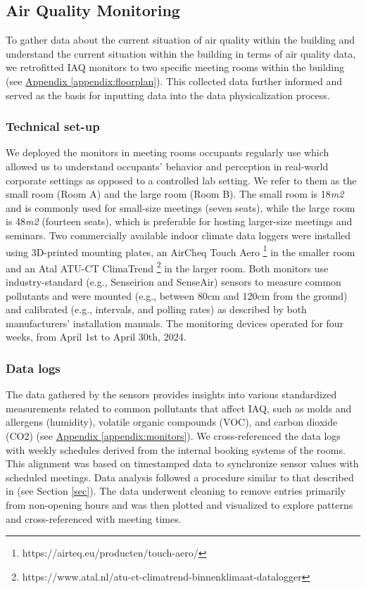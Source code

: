 \newpage

\subsection{Air Quality Monitoring}
\label{sec:monitoring}

To gather data about the current situation of air quality within the building and understand the current situation within the building in terms of air quality data, we retrofitted IAQ monitors to two specific meeting rooms within the building (see \hyperref[appendix:floorplan]{Appendix \ref*{appendix:floorplan}}). This collected data further informed and served as the basis for inputting data into the data physicalization process.

\subsubsection{Technical set-up}

We deployed the monitors in meeting rooms occupants regularly use which allowed us to understand occupants' behavior and perception in real-world corporate settings as opposed to a controlled lab setting. We refer to them as the small room (Room A) and the large room (Room B). The small room is 18\textit{m2} and is commonly used for small-size meetings (seven seats), while the large room is 48\textit{m2} (fourteen seats), which is preferable for hosting larger-size meetings and seminars. Two commercially available indoor climate data loggers were installed using 3D-printed mounting plates, an AirCheq Touch Aero \footnote{https://airteq.eu/producten/touch-aero/} in the smaller room and an Atal ATU-CT ClimaTrend \footnote{https://www.atal.nl/atu-ct-climatrend-binnenklimaat-datalogger} in the larger room. Both monitors use industry-standard (e.g., Senseirion and SenseAir) sensors to measure common pollutants and were mounted (e.g., between 80cm and 120cm from the ground) and calibrated (e.g., intervals, and polling rates) as described by both manufacturers' installation manuals. The monitoring devices operated for four weeks, from April 1st to April 30th, 2024.

\subsubsection{Data logs}

The data gathered by the sensors provides insights into various standardized measurements related to common pollutants that affect IAQ, such as molds and allergens (humidity), volatile organic compounds (VOC), and carbon dioxide (CO2) (see \hyperref[appendix:monitors]{Appendix \ref*{appendix:monitors}}). We cross-referenced the data logs with weekly schedules derived from the internal booking systems of the rooms. This alignment was based on timestamped data to synchronize sensor values with scheduled meetings. Data analysis followed a procedure similar to that described in (see Section \ref*{sec}). The data underwent cleaning to remove entries primarily from non-opening hours and was then plotted and visualized to explore patterns and cross-referenced with meeting times.


